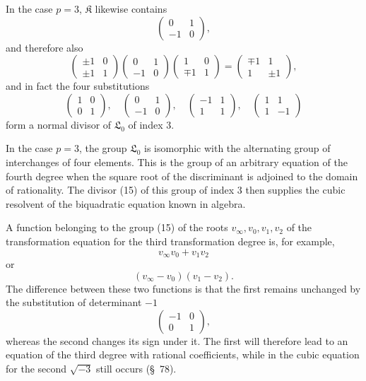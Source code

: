 \documentclass[11pt]{article}
\newcommand{\Lzero}{\mathfrak L_0}
\newcommand{\Kgrp}{\mathfrak K}
\begin{document}
In the case $p=3$, $\Kgrp$ likewise contains
\[
 \begin{pmatrix}0&1\\-1&0\end{pmatrix},
\]
and therefore also
\[
 \begin{pmatrix}\pm1&0\\\pm1&1\end{pmatrix}
 \begin{pmatrix}0&1\\-1&0\end{pmatrix}
 \begin{pmatrix}1&0\\\mp1&1\end{pmatrix}
 =
 \begin{pmatrix}\mp1&1\\1&\pm1\end{pmatrix},
\]
and in fact the four substitutions
\begin{equation}
 \begin{pmatrix}1&0\\0&1\end{pmatrix},
 \quad
 \begin{pmatrix}0&1\\-1&0\end{pmatrix},
 \quad
 \begin{pmatrix}-1&1\\1&1\end{pmatrix},
 \quad
 \begin{pmatrix}1&1\\1&-1\end{pmatrix}
\tag{15}
\end{equation}
form a normal divisor of $\Lzero$ of index $3$.

In the case $p=3$, the group $\Lzero$ is isomorphic with the alternating group of interchanges of four elements. This is the group of an arbitrary equation of the fourth degree when the square root of the discriminant is adjoined to the domain of rationality. The divisor (15) of this group of index $3$ then supplies the cubic resolvent of the biquadratic equation known in algebra.

A function belonging to the group (15) of the roots $v_\infty,v_0,v_1,v_2$ of the transformation equation for the third transformation degree is, for example,
\[
 v_\infty v_0+v_1v_2
\]
or
\[
 (v_\infty-v_0)(v_1-v_2).
\]
The difference between these two functions is that the first remains unchanged by the substitution of determinant $-1$
\[
 \begin{pmatrix}-1&0\\0&1\end{pmatrix},
\]
whereas the second changes its sign under it. The first will therefore lead to an equation of the third degree with rational coefficients, while in the cubic equation for the second $\sqrt{-3}$ still occurs (\S~78).
\end{document}
